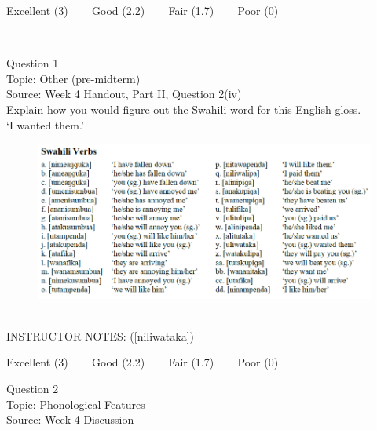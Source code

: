 \documentclass[12pt]{article}
\begin{document}
\vfill
Excellent (3) ~~~ Good (2.2) ~~~ Fair (1.7) ~~~ Poor (0)
\newpage

\begin{center}
\textbf{{\color{red}{\HUGE END OF EXAM}}}\\

\end{center}
\newpage

\begin{center}
\textbf{{\color{blue}{\HUGE START OF EXAM\\}}}

\textbf{{\color{blue}{\HUGE Student ID: 23000\\}}}

\textbf{{\color{blue}{\HUGE 9:20\\}}}

\end{center}
\newpage

{\large Question 1}\\

Topic: Other (pre-midterm)\\
Source: Week 4 Handout, Part II, Question 2(iv)\\

Explain how you would figure out the Swahili word for this English gloss.\\

‘I wanted them.’

\begin{figure}[H]
\includegraphics{../images/swahiliverbs.png}
\end{figure}

~\\
INSTRUCTOR NOTES: ([niliwataka])


\vfill
Excellent (3) ~~~ Good (2.2) ~~~ Fair (1.7) ~~~ Poor (0)
\newpage

{\large Question 2}\\

Topic: Phonological Features\\
Source: Week 4 Discussion\\
\end{document}
